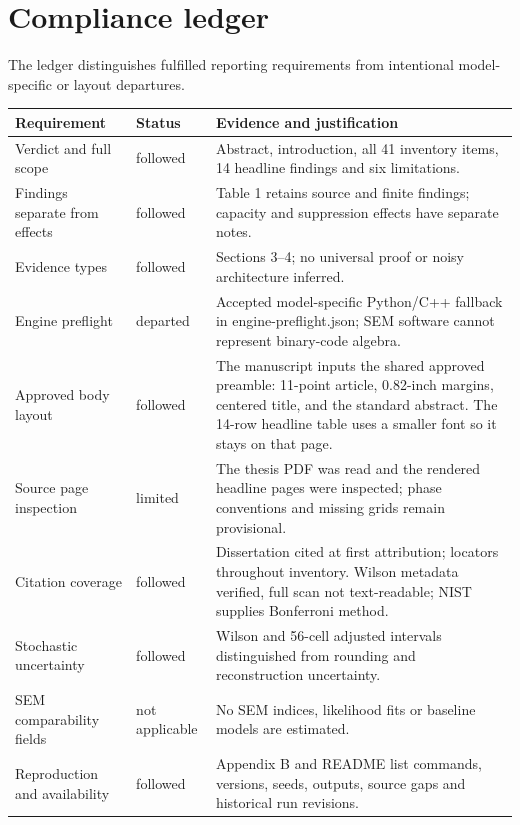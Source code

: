 \section{Compliance ledger}
The ledger distinguishes fulfilled reporting requirements from intentional model-specific or layout departures.
\begin{longtable}{@{}>{\raggedright\arraybackslash}p{.28\linewidth}>{\raggedright\arraybackslash}p{.16\linewidth}>{\raggedright\arraybackslash}p{.50\linewidth}@{}}
\toprule Requirement & Status & Evidence and justification\\\midrule\endhead
Verdict and full scope & followed & Abstract, introduction, all 41 inventory items, 14 headline findings and six limitations.\\
Findings separate from effects & followed & Table 1 retains source and finite findings; capacity and suppression effects have separate notes.\\
Evidence types & followed & Sections 3--4; no universal proof or noisy architecture inferred.\\
Engine preflight & departed & Accepted model-specific Python/C++ fallback in engine-preflight.json; SEM software cannot represent binary-code algebra.\\
Approved body layout & followed & The manuscript inputs the shared approved preamble: 11-point article, 0.82-inch margins, centered title, and the standard abstract. The 14-row headline table uses a smaller font so it stays on that page.\\
Source page inspection & limited & The thesis PDF was read and the rendered headline pages were inspected; phase conventions and missing grids remain provisional.\\
Citation coverage & followed & Dissertation cited at first attribution; locators throughout inventory. Wilson metadata verified, full scan not text-readable; NIST supplies Bonferroni method.\\
Stochastic uncertainty & followed & Wilson and 56-cell adjusted intervals distinguished from rounding and reconstruction uncertainty.\\
SEM comparability fields & not applicable & No SEM indices, likelihood fits or baseline models are estimated.\\
Reproduction and availability & followed & Appendix B and README list commands, versions, seeds, outputs, source gaps and historical run revisions.\\
\bottomrule
\end{longtable}



